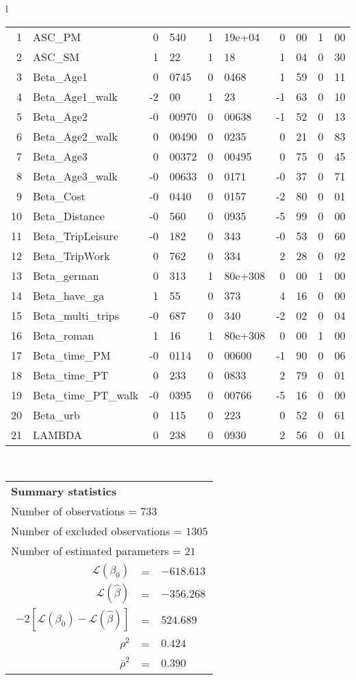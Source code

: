 \begin{tabular}{l}
\begin{tabular}{rlr@{.}lr@{.}lr@{.}lr@{.}l}
1 & ASC_PM  & 0&540 & 1&19e+04 & 0&00 & 1&00\\
2 & ASC_SM & 1&22 & 1&18 & 1&04 & 0&30\\
3 & Beta_Age1 & 0&0745 & 0&0468 & 1&59 & 0&11\\
4 & Beta_Age1_walk & -2&00 & 1&23 & -1&63 & 0&10\\
5 & Beta_Age2 & -0&00970 & 0&00638 & -1&52 & 0&13\\
6 & Beta_Age2_walk & 0&00490 & 0&0235 & 0&21 & 0&83\\
7 & Beta_Age3 & 0&00372 & 0&00495 & 0&75 & 0&45\\
8 & Beta_Age3_walk & -0&00633 & 0&0171 & -0&37 & 0&71\\
9 & Beta_Cost & -0&0440 & 0&0157 & -2&80 & 0&01\\
10 & Beta_Distance & -0&560 & 0&0935 & -5&99 & 0&00\\
11 & Beta_TripLeisure & -0&182 & 0&343 & -0&53 & 0&60\\
12 & Beta_TripWork & 0&762 & 0&334 & 2&28 & 0&02\\
13 & Beta_german & 0&313 & 1&80e+308 & 0&00 & 1&00\\
14 & Beta_have_ga & 1&55 & 0&373 & 4&16 & 0&00\\
15 & Beta_multi_trips & -0&687 & 0&340 & -2&02 & 0&04\\
16 & Beta_roman & 1&16 & 1&80e+308 & 0&00 & 1&00\\
17 & Beta_time_PM & -0&0114 & 0&00600 & -1&90 & 0&06\\
18 & Beta_time_PT & 0&233 & 0&0833 & 2&79 & 0&01\\
19 & Beta_time_PT_walk & -0&0395 & 0&00766 & -5&16 & 0&00\\
20 & Beta_urb & 0&115 & 0&223 & 0&52 & 0&61\\
21 & LAMBDA & 0&238 & 0&0930 & 2&56 & 0&01\\
\hline
\end{tabular}
\\
\begin{tabular}{rcl}
\multicolumn{3}{l}{\bf Summary statistics}\\
\multicolumn{3}{l}{ Number of observations = $733$} \\
\multicolumn{3}{l}{ Number of excluded observations = $1305$} \\
\multicolumn{3}{l}{ Number of estimated  parameters = $21$} \\
 $\mathcal{L}(\beta_0)$ &=&  $-618.613$ \\
 $\mathcal{L}(\hat{\beta})$ &=& $-356.268 $  \\
 $-2[\mathcal{L}(\beta_0) -\mathcal{L}(\hat{\beta})]$ &=& $524.689$ \\
    $\rho^2$ &=&   $0.424$ \\
    $\bar{\rho}^2$ &=&    $0.390$ \\
\end{tabular}
  \end{tabular}
